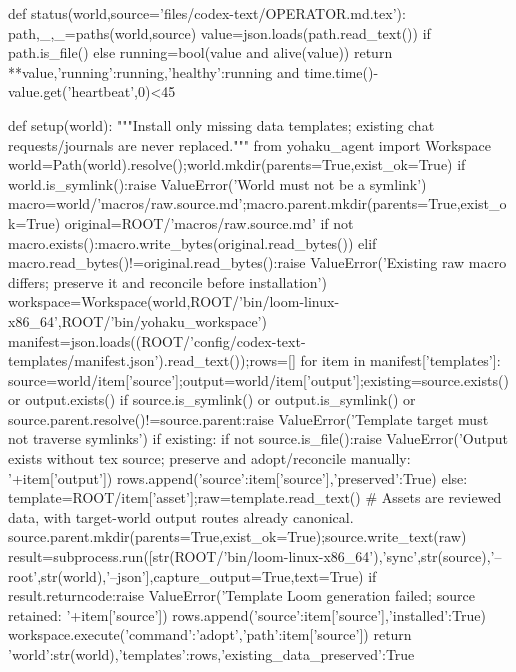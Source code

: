 def status(world,source='files/codex-text/OPERATOR.md.tex'):
    path,_,_=paths(world,source)
    value=json.loads(path.read_text()) if path.is_file() else {}
    running=bool(value and alive(value))
    return {**value,'running':running,'healthy':running and time.time()-value.get('heartbeat',0)<45}

def setup(world):
    """Install only missing data templates; existing chat requests/journals are never replaced."""
    from yohaku_agent import Workspace
    world=Path(world).resolve();world.mkdir(parents=True,exist_ok=True)
    if world.is_symlink():raise ValueError('World must not be a symlink')
    macro=world/'macros/raw.source.md';macro.parent.mkdir(parents=True,exist_ok=True)
    original=ROOT/'macros/raw.source.md'
    if not macro.exists():macro.write_bytes(original.read_bytes())
    elif macro.read_bytes()!=original.read_bytes():raise ValueError('Existing raw macro differs; preserve it and reconcile before installation')
    workspace=Workspace(world,ROOT/'bin/loom-linux-x86_64',ROOT/'bin/yohaku_workspace')
    manifest=json.loads((ROOT/'config/codex-text-templates/manifest.json').read_text());rows=[]
    for item in manifest['templates']:
        source=world/item['source'];output=world/item['output'];existing=source.exists() or output.exists()
        if source.is_symlink() or output.is_symlink() or source.parent.resolve()!=source.parent:raise ValueError('Template target must not traverse symlinks')
        if existing:
            if not source.is_file():raise ValueError('Output exists without tex source; preserve and adopt/reconcile manually: '+item['output'])
            rows.append({'source':item['source'],'preserved':True})
        else:
            template=ROOT/item['asset'];raw=template.read_text()
            # Assets are reviewed data, with target-world output routes already canonical.
            source.parent.mkdir(parents=True,exist_ok=True);source.write_text(raw)
            result=subprocess.run([str(ROOT/'bin/loom-linux-x86_64'),'sync',str(source),'--root',str(world),'--json'],capture_output=True,text=True)
            if result.returncode:raise ValueError('Template Loom generation failed; source retained: '+item['source'])
            rows.append({'source':item['source'],'installed':True})
        workspace.execute({'command':'adopt','path':item['source']})
    return {'world':str(world),'templates':rows,'existing_data_preserved':True}

